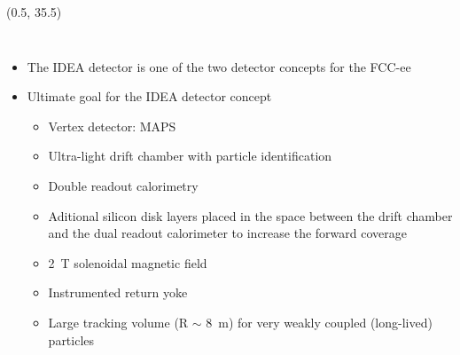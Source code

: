 \documentclass[final,xcolor={dvipsnames,svgnames,x11names,table}]{beamer}
\begin{document}
\begin{frame}
\begin{textblock}{83}(0.5, 35.5)
  \begin{tcolorbox}[title=The IDEA detector concept for FCC-ee]

  \begin{columns}
      \begin{itemize}
        \item The IDEA detector is one of the two detector concepts for the FCC-ee \vspace{0.5cm}
        \item Ultimate goal for the IDEA detector concept \vspace{0.5cm}
          \begin{itemize}
            \item Vertex detector: MAPS \vspace{0.2cm}
            \item Ultra-light drift chamber with particle identification \vspace{0.2cm}
            \item Double readout calorimetry \vspace{0.2cm}
            \item Aditional silicon disk layers placed in the space between the drift chamber and the dual readout calorimeter to increase the forward coverage \vspace{0.2cm}
            \item 2~T solenoidal magnetic field \vspace{0.2cm}
            \item Instrumented return yoke \vspace{0.2cm}
            \item Large tracking volume (R $\sim$ 8~m) for very weakly coupled (long-lived) particles
          \end{itemize}
      \end{itemize}



\end{columns}
\end{tcolorbox}
\end{textblock}
\end{frame}
\end{document}
